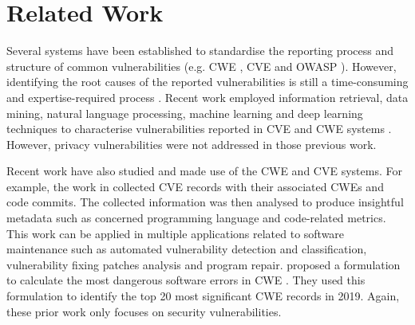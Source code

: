 \section{Related Work} \label{sec:related-work}

Several systems have been established to standardise the reporting process and structure of common vulnerabilities (e.g. CWE \cite{CWE}, CVE \cite{CVE} and OWASP \cite{OWASP2020}). However, identifying the root causes of the reported vulnerabilities is still a time-consuming and expertise-required process \cite{Gonzalez2019}. Recent work employed information retrieval, data mining, natural language processing, machine learning and deep learning techniques to characterise vulnerabilities reported in CVE and CWE systems \cite{Li2017, Gonzalez2019, Liu2020a}.  However, privacy vulnerabilities were not addressed in those previous work.

Recent work have also studied and made use of the CWE and CVE systems. For example, the work in \cite{Bhandari2021} collected CVE records with their associated CWEs and code commits. The collected information was then analysed to produce insightful metadata such as concerned programming language and code-related metrics. This work can be applied in multiple applications related to software maintenance such as automated vulnerability detection and classification, vulnerability fixing patches analysis and program repair. \citeauthor{Galhardo2020} proposed a formulation to calculate the most dangerous software errors in CWE \cite{Galhardo2020}. They used this formulation to identify the top 20 most significant CWE records in 2019. Again, these prior work only focuses on security vulnerabilities.

